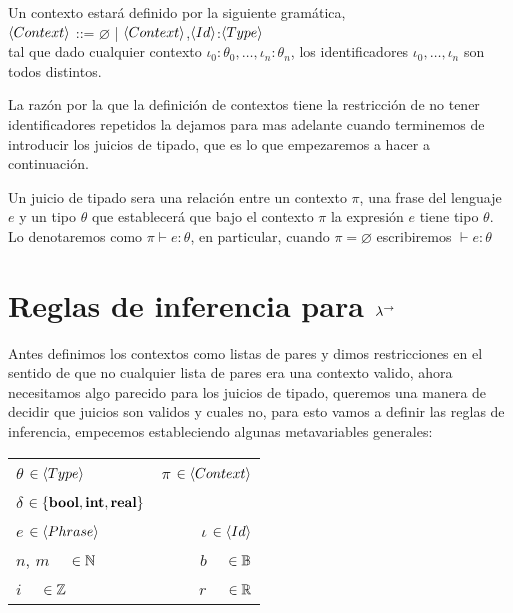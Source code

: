 \begin{definition}\label{lambdaa:context}

Un contexto estar\'a definido por la siguiente gram\'atica,\\

\noindent
$\langle Context \rangle$ ::= $\varnothing$ | $\langle Context \rangle$,$\langle Id \rangle$:$\langle Type \rangle$\\

\noindent
tal que dado cualquier contexto $\iota_0:\theta_0,\ldots,\iota_n:\theta_n$, los
identificadores $\iota_0,\ldots,\iota_n$ son todos distintos.

\end{definition}

La razón por la que la definici\'on de contextos tiene la restricci\'on de
no tener identificadores repetidos la
dejamos para mas adelante cuando terminemos de introducir los juicios de tipado, 
que es lo que empezaremos a hacer a continuaci\'on.

\begin{definition}\label{lambdaa:typejugment}

Un juicio de tipado sera una relaci\'on entre un contexto $\pi$, una
frase del lenguaje $e$ y un tipo $\theta$ que establecer\'a que
bajo el contexto $\pi$ la expresi\'on $e$ tiene tipo $\theta$.
Lo denotaremos como  $\pi \vdash e : \theta$, 
en particular, cuando $\pi = \varnothing$ escribiremos
$\vdash e : \theta$

\end{definition}

\section{Reglas de inferencia para $\lambda^{\rightarrow}$}

Antes definimos los contextos como listas de pares y dimos restricciones 
en el sentido de que no cualquier lista de pares era una contexto valido,
ahora necesitamos algo parecido para los juicios de tipado, queremos
una manera de decidir que juicios son validos y cuales no, para esto
vamos a definir las reglas de inferencia, empecemos estableciendo algunas
metavariables generales:

\begin{center}
\begin{tabular}{ l r }
	$\theta$ $\in \langle Type \rangle$ & $\pi$ $\in \langle Context \rangle$ \\
	$\delta$ $\in \{ \textbf{bool},\textbf{int},\textbf{real} \}$ & \\
	$e$ $\in \langle Phrase \rangle$ & $\iota$ $\in \langle Id \rangle$ \\
	$n$, $m$ \ \ $\in \mathbb{N}$ & $b$ \ \ $\in \mathbb{B}$ \\
	$i$ \ \ $\in \mathbb{Z}$ & $r$ \ \ $\in \mathbb{R}$ 
\end{tabular}
\end{center}

